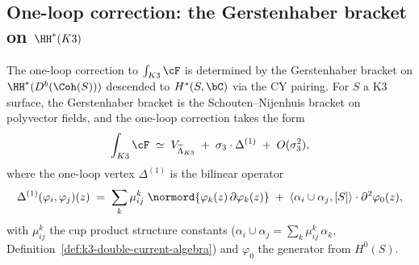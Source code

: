 \subsection{One-loop correction: the Gerstenhaber bracket on \texorpdfstring{$\HH^*(K3)$}{HH-*(K3)}}
\label{subsec:k3-fact-one-loop}

\begin{conjecture}
\label{conj:k3-fact-one-loop}
\ClaimStatusConjectured
The one-loop correction to $\int_{K3} \cF$ is determined by the
Gerstenhaber bracket on $\HH^*(D^b(\Coh(S)))$ descended to
$H^*(S, \bC)$ via the CY pairing. For $S$ a K3 surface, the
Gerstenhaber bracket is the Schouten--Nijenhuis bracket on
polyvector fields, and the one-loop correction takes the form
\begin{equation}\label{eq:k3-fact-one-loop}
 \int_{K3} \cF
 \;\simeq\;
 V_{\widetilde{\Lambda}_{K3}}
 \;+\;
 \sigma_3 \cdot \Delta^{(1)}
 \;+\;
 O(\sigma_3^2),
\end{equation}
where the one-loop vertex $\Delta^{(1)}$ is the bilinear operator
\begin{equation}\label{eq:one-loop-vertex}
 \Delta^{(1)}(\varphi_i, \varphi_j)(z)
 \;=\;
 \sum_{k} \mu^k_{ij}\;
 \normord{\varphi_k(z)\, \partial\varphi_k(z)}
 \;+\;
 \langle \alpha_i \cup \alpha_j, [S] \rangle
 \cdot \partial^2 \varphi_0(z),
\end{equation}
with $\mu^k_{ij}$ the cup product structure constants
($\alpha_i \cup \alpha_j = \sum_k \mu^k_{ij}\, \alpha_k$,
Definition~\textup{\ref{def:k3-double-current-algebra}})
and $\varphi_0$ the generator from $H^0(S)$.
\end{conjecture}

